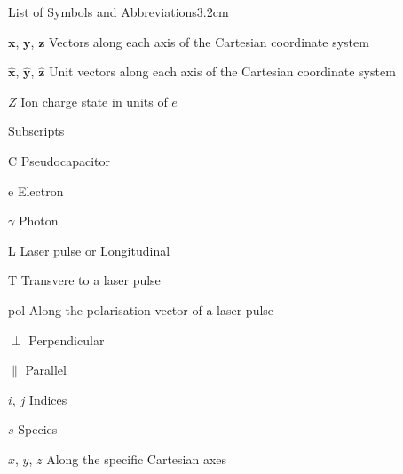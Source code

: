 \begin{mclistof}{List of Symbols and Abbreviations}{3.2cm}
\item[$\mathbf{x}$, $\mathbf{y}$, $\mathbf{z}$] Vectors along each axis of the Cartesian coordinate system
\item[$\hat{\mathbf{x}}$, $\hat{\mathbf{y}}$, $\hat{\mathbf{z}}$] Unit vectors along each axis of the Cartesian coordinate system
\item[$Z$] Ion charge state in units of $e$
\item[Subscripts] 
\item[$\mathrm{C}$] Pseudocapacitor
\item[$\mathrm{e}$] Electron
\item[$\gamma$] Photon
\item[L] Laser pulse or Longitudinal
\item[T] Transvere to a laser pulse
\item[pol] Along the polarisation vector of a laser pulse
\item[$\perp$] Perpendicular
\item[$\|$] Parallel
\item[$i$, $j$] Indices
\item[$s$] Species
\item[$x$, $y$, $z$] Along the specific Cartesian axes


\end{mclistof}
